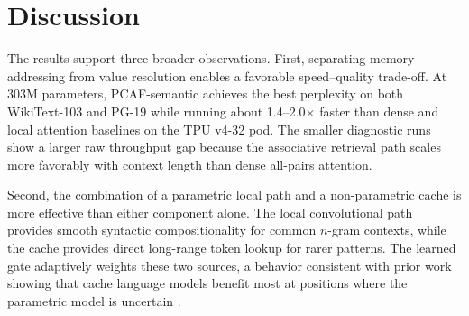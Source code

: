 \documentclass[11pt]{article}
\newcommand{\tableformat}{\footnotesize\setlength{\tabcolsep}{4pt}\renewcommand{\arraystretch}{1.08}}
\begin{document}
\begin{table}[!htbp]
  \centering
  \caption{WikiText-2 next-token prediction at context length 2048.
  PCAF-context benefits from the longer context while sparse attention
  becomes slower and less accurate under this memory budget.}
  \label{tab:main2048}
  \begingroup
  \tableformat
  \endgroup
\end{table}
\FloatBarrier

\section{Discussion}

The results support three broader observations. First, separating memory
addressing from value resolution enables a favorable speed--quality trade-off.
At 303M parameters, PCAF-semantic achieves the best perplexity on both
WikiText-103 and PG-19 while running about 1.4--2.0$\times$ faster than dense
and local attention baselines on the TPU v4-32 pod. The smaller diagnostic runs
show a larger raw throughput gap because the associative retrieval path scales
more favorably with context length than dense all-pairs attention.

Second, the combination of a parametric local path and a non-parametric cache
is more effective than either component alone. The local convolutional path
provides smooth syntactic compositionality for common $n$-gram contexts, while
the cache provides direct long-range token lookup for rarer patterns. The
learned gate adaptively weights these two sources, a behavior consistent with
prior work showing that cache language models benefit most at positions where
the parametric model is uncertain
\citep{grave2016continuous,khandelwal2019knn}.
\end{document}
